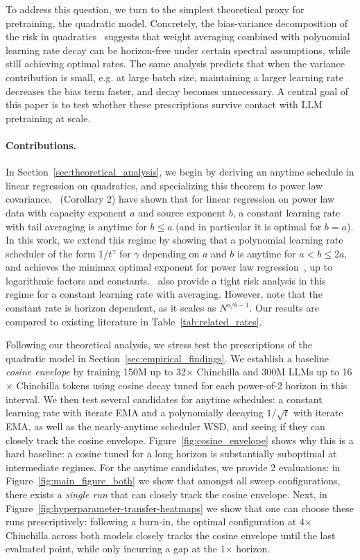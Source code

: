 \documentclass{article}
\theoremstyle{plain}
\begin{document}
To address this question, we turn to the simplest theoretical proxy for pretraining, the quadratic model. Concretely, the bias-variance decomposition of the risk in quadratics~\citep{jain2018parallelizing,zou2023benign} suggests that weight averaging combined with polynomial learning rate decay can be horizon-free under certain spectral assumptions, while still achieving optimal rates. The same analysis predicts that when the variance contribution is small, e.g. at large batch size, maintaining a larger learning rate decreases the bias term faster, and decay becomes unnecessary. A central goal of this paper is to test whether these prescriptions survive contact with LLM pretraining at scale.

\paragraph{Contributions.} In Section~\ref{sec:theoretical_analysis}, we begin by deriving an anytime schedule in linear regression on quadratics, and specializing this theorem to power law covariance.~\citet{zhang2024does} (Corollary 2) have shown that for linear regression on power law data with capacity exponent $a$ and source exponent $b$, a constant learning rate with tail averaging is anytime for $b \leq a$ (and in particular it is optimal for $b=a$). In this work, we extend this regime by showing that a polynomial learning rate scheduler of the form $1/t^\gamma$ for $\gamma$ depending on $a$ and $b$ is anytime for $a < b \leq 2a$, and achieves the minimax optimal exponent for power law regression~\citep{zhang2024optimality}, up to logarithmic factors and constants.~\citet{zhang2024does} also provide a tight risk analysis in this regime for a constant learning rate with averaging. However, note that the constant rate is horizon dependent, as it scales as $N^{a/b - 1}$. Our results are compared to existing literature in Table~\ref{tab:related_rates}.

Following our theoretical analysis, we stress test the prescriptions of the quadratic model in Section~\ref{sec:empirical_findings}. We establish a baseline \textit{cosine envelope} by training 150M up to 32$\times$ Chinchilla and 300M LLMs up to 16$\times$ Chinchilla tokens using cosine decay tuned for each power-of-2 horizon in this interval. We then test several candidates for anytime schedules: a constant learning rate with iterate EMA and a polynomially decaying $1/\sqrt{t}$ with iterate EMA, as well as the nearly-anytime scheduler WSD, and seeing if they can closely track the cosine envelope. Figure~\ref{fig:cosine_envelope} shows why this is a hard baseline: a cosine tuned for a long horizon is substantially suboptimal at intermediate regimes. For the anytime candidates, we provide 2 evaluations: in Figure~\ref{fig:main_figure_both} we show that amongst all sweep configurations, there exists a \textit{single run} that can closely track the cosine envelope. Next, in Figure~\ref{fig:hyperparameter-transfer-heatmaps} we show that one can choose these runs prescriptively: following a burn-in, the optimal configuration at 4$\times$ Chinchilla across both models closely tracks the cosine envelope until the last evaluated point, while only incurring a gap at the 1$\times$ horizon. 
\end{document}

